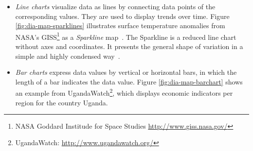 \begin{itemize}
\begin{itemize}
\item \textit{Line charts} visualize data as lines by connecting data points of the corresponding values. They are used to display trends over time. Figure \ref{fig:dia-map-sparklines} illustrates surface temperature anomalies from NASA's GISS\footnote{NASA Goddard Institude for Space Studies \url{http://www.giss.nasa.gov/}} as a \textit{Sparkline} map~\cite{web:sparkmaps}. The Sparkline is a reduced line chart without axes and coordinates. It presents the general shape of variation in a simple and highly condensed way~\cite{wiki:sparkline}.

\item \textit{Bar charts} express data values by vertical or horizontal bars, in which the length of a bar indicates the data value. Figure \ref{fig:dia-map-barchart} shows an example from UgandaWatch\footnote{UgandaWatch: \url{http://www.ugandawatch.org/}}, which displays economic indicators per region for the country Uganda.


\end{itemize}
\end{itemize}
